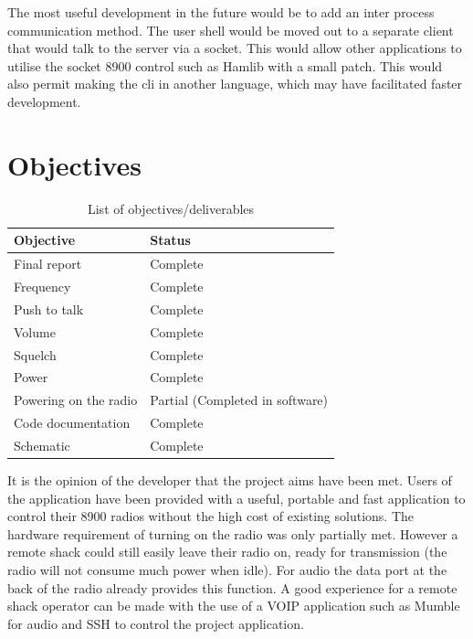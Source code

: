 The most useful development in the future would be to add an inter process communication method. The user shell would be moved out to a separate client that would talk to the server via a socket. This would allow other applications to utilise the socket \gls{8900} control such as Hamlib with a small patch. This would also permit making the \gls{cli} in another language, which may have facilitated faster development.

\section{Objectives}

\begin{table}[H]
\centering
\begin{tabular}{l|l}
Objective & Status \\
\hline
Final report & Complete \\
Frequency & Complete \\
Push to talk & Complete \\
Volume & Complete \\
Squelch & Complete \\
Power & Complete \\
Powering on the radio & Partial (Completed in software) \\
Code documentation & Complete \\
Schematic & Complete
\end{tabular}
\caption{List of objectives/deliverables}
\label{table:objectives}
\end{table}

It is the opinion of the developer that the project aims have been met. Users of the application have been provided with a useful, portable and fast application to control their \gls{8900} radios without the high cost of existing solutions. The hardware requirement of turning on the radio was only partially met. However a remote shack could still easily leave their radio on, ready for transmission (the radio will not consume much power when idle). For audio the data port at the back of the radio already provides this function. A good experience for a remote shack operator can be made with the use of a VOIP application such as Mumble~\cite{mumble} for audio and SSH to control the project application.